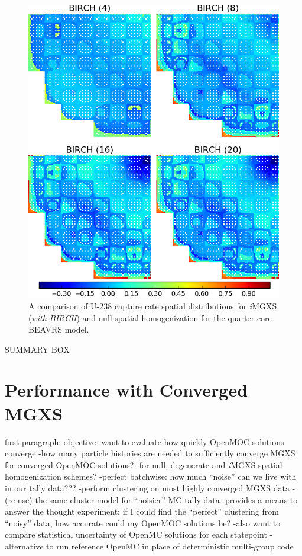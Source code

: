 \begin{figure}[h!]
\centering
\includegraphics[width=0.9\linewidth]{figures/results/compare/full-core/compare-capt-birch}
\vspace{2mm}
\caption[U-238 capture rate comparison for the quarter core BEAVRS model]{A comparison of U-238 capture rate spatial distributions for \textit{i}\ac{MGXS} (\textit{with BIRCH}) and null spatial homogenization for the quarter core BEAVRS model.}
\label{fig:chap11-assm-full-core-capt-rates-birch-comp}
\end{figure}

\clearpage

SUMMARY BOX


\section{Performance with Converged MGXS}
\label{sec:chap11-converge}

first paragraph: objective
-want to evaluate how quickly OpenMOC solutions converge
-how many particle histories are needed to sufficiently converge \ac{MGXS} for converged OpenMOC solutions?
  -for null, degenerate and \textit{i}\ac{MGXS} spatial homogenization schemes?
-perfect batchwise: how much ``noise'' can we live with in our tally data???
  -perform clustering on most highly converged \ac{MGXS} data
  -(re-use) the same cluster model for ``noisier'' \ac{MC} tally data
  -provides a means to answer the thought experiment: if I could find the ``perfect'' clustering from ``noisy'' data, how accurate could my OpenMOC solutions be?
-also want to compare statistical uncertainty of OpenMC solutions for each statepoint
  -alternative to run reference OpenMC in place of deterministic multi-group code

